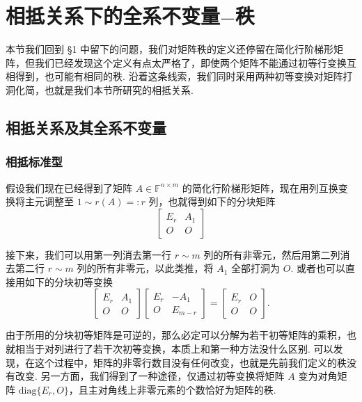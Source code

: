 \documentclass[10pt,openany]{article}
\theoremstyle{thmstyle} %
\theoremstyle{defstyle} %
\theoremstyle{prostyle} %
\theoremstyle{exastyle}
\theoremstyle{remstyle}
\newcommand{\F}{\mathbb{F}}
\newcommand{\nm}{^{n \times m}}
\newcommand{\diag}{\mathrm{diag}}
\begin{document}
\pagestyle{fancy}
\rhead{\today}
	
\setcounter{section}{2}


\section{相抵关系下的全系不变量\(-\)秩}

本节我们回到 \S 1 中留下的问题，我们对矩阵秩的定义还停留在简化行阶梯形矩阵，但我们已经发现这个定义有点太严格了，即使两个矩阵不能通过初等行变换互相得到，也可能有相同的秩. 沿着这条线索，我们同时采用两种初等变换对矩阵打洞化简，也就是我们本节所研究的相抵关系. 

\subsection{相抵关系及其全系不变量} \label{sec3.1}

\subsubsection{相抵标准型}

假设我们现在已经得到了矩阵 \( A \in \F\nm \) 的简化行阶梯形矩阵，现在用列互换变换将主元调整至 \( 1 \sim r(A)=:r \) 列，也就得到如下的分块矩阵
\[ \begin{bmatrix}
	E_r & A_1 \\
	O & O
\end{bmatrix} \]

接下来，我们可以用第一列消去第一行 \( r \sim m \) 列的所有非零元，然后用第二列消去第二行 \( r \sim m \) 列的所有非零元，以此类推，将 \( A_1 \) 全部打洞为 \( O \). 或者也可以直接用如下的分块初等变换
\[ \begin{bmatrix}
	E_r & A_1 \\
	O & O
\end{bmatrix}\begin{bmatrix}
E_r & -A_1 \\
O & E_{m-r}
\end{bmatrix}=\begin{bmatrix}
E_r & O \\
O & O
\end{bmatrix}. \]

由于所用的分块初等矩阵是可逆的，那么必定可以分解为若干初等矩阵的乘积，也就相当于对列进行了若干次初等变换，本质上和第一种方法没什么区别. 可以发现，在这个过程中，矩阵的非零行数目没有任何改变，也就是先前我们定义的秩没有改变. 另一方面，我们得到了一种途径，仅通过初等变换将矩阵 \( A \) 变为对角矩阵 \( \diag\{E_r,O\} \)，且主对角线上非零元素的个数恰好为矩阵的秩. 
\end{document}
